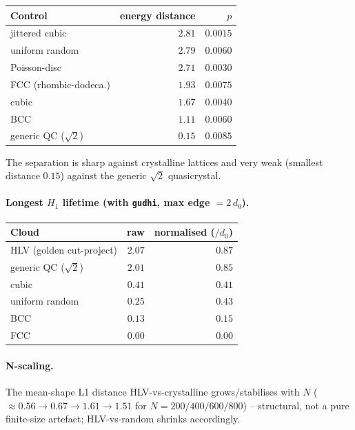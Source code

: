\begin{center}
\begin{tabular}{lrr}
\hline
Control & energy distance & $p$ \\
\hline
jittered cubic        & $2.81$ & $0.0015$ \\
uniform random        & $2.79$ & $0.0060$ \\
Poisson-disc          & $2.71$ & $0.0030$ \\
FCC (rhombic-dodeca.) & $1.93$ & $0.0075$ \\
cubic                 & $1.67$ & $0.0040$ \\
BCC                   & $1.11$ & $0.0060$ \\
generic QC ($\sqrt2$) & $0.15$ & $0.0085$ \\
\hline
\end{tabular}
\end{center}

\noindent The separation is sharp against crystalline lattices and very weak
(smallest distance $0.15$) against the generic $\sqrt{2}$ quasicrystal.

\paragraph{Longest $H_1$ lifetime (with \texttt{gudhi}, max edge $=2\,d_0$).}

\begin{center}
\begin{tabular}{lrr}
\hline
Cloud & raw & normalised ($/d_0$) \\
\hline
HLV (golden cut-project)    & $2.07$ & $0.87$ \\
generic QC ($\sqrt2$)       & $2.01$ & $0.85$ \\
cubic                       & $0.41$ & $0.41$ \\
uniform random              & $0.25$ & $0.43$ \\
BCC                         & $0.13$ & $0.15$ \\
FCC                         & $0.00$ & $0.00$ \\
\hline
\end{tabular}
\end{center}

\paragraph{N-scaling.} The mean-shape L1 distance HLV-vs-crystalline
grows/stabilises with $N$ ($\approx 0.56 \to 0.67 \to 1.61 \to 1.51$ for
$N=200/400/600/800$) -- structural, not a pure finite-size artefact;
HLV-vs-random shrinks accordingly.

